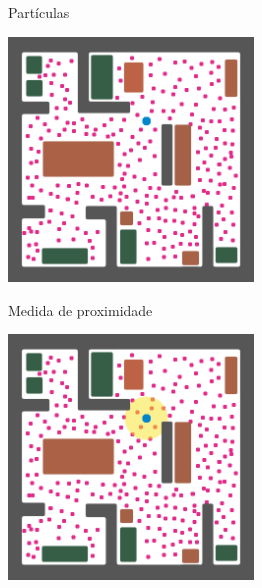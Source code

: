 \documentclass{beamer}
\begin{document}
\begin{frame}{Partículas}


 
  \begin{center}
  \includegraphics[height=6.5cm,keepaspectratio]{2-particle-filter-initial.png}
  \end{center}

\end{frame}

\begin{frame}{Medida de proximidade}
 

  \begin{center}
  \includegraphics[height=6.5cm,keepaspectratio]{3-particle-filter-sensor-sweep.png}
  \end{center}

\end{frame}
\end{document}
